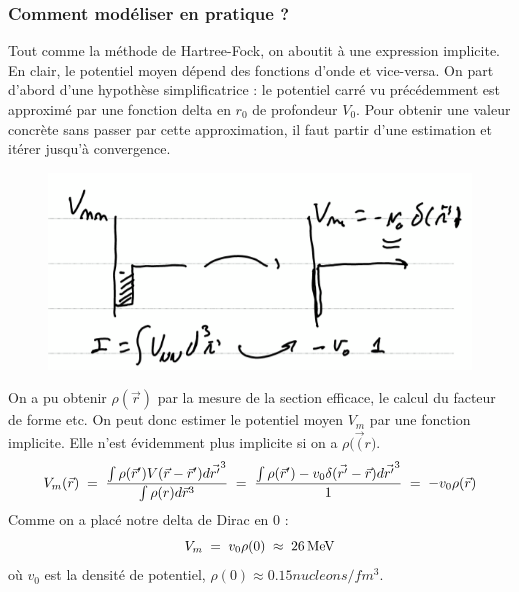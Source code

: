 \subsubsection{Comment modéliser en pratique ?}
Tout comme la méthode de Hartree-Fock, on aboutit à une expression implicite. En clair, le potentiel moyen dépend des fonctions d'onde et vice-versa. On part d'abord d'une hypothèse simplificatrice : le potentiel carré vu précédemment est approximé par une fonction delta en $r_0$ de profondeur $V_0$. Pour obtenir une valeur concrète sans passer par cette approximation, il faut partir d'une estimation et itérer jusqu'à convergence.
\begin{figure}[H]
    \centering
    \includegraphics[scale = 0.8]{Images4/delta_potentiel.PNG}
\end{figure}
On a pu obtenir $\rho(\Vec{r})$ par la mesure de la section efficace, le calcul du facteur de forme etc. On peut donc estimer le potentiel moyen $V_{m}$ par une fonction implicite. Elle n'est évidemment plus implicite si on a $\rho(\vec({r)}$.
\[
    V_m(\vec{r}) \; = \; \dfrac{\int \rho(\vec{r}')V(\vec{r}-\vec{r}')d\vec{r'}^3}{\int \rho(r)d\vec{r}^3}\; = \; \dfrac{\int \rho(\vec{r}')-v_0\delta(\vec{r'}-\vec{r})d\vec{r'}^3}{1}\; = \; -v_0 \rho(\vec{r})
\]
Comme on a placé notre delta de Dirac en 0 :
\[
    V_m \; = \; v_0 \rho(0) \; \approx \; \SI{26}{MeV}
\]
où $v_0$ est la densité de potentiel, $\rho(0) \approx 0.15nucleons/\si{fm^3}$.\\

